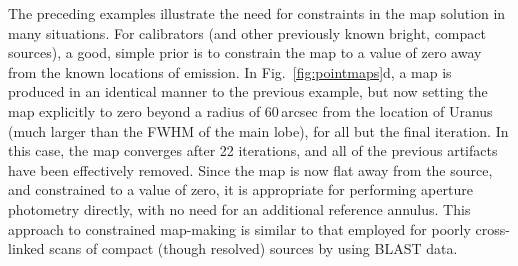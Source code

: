 \documentclass[useAMS,usenatbib,nofootinbib]{mn2e}
\begin{document}
The preceding examples illustrate the need for constraints in the map
solution in many situations. For calibrators (and other previously
known bright, compact sources), a good, simple prior is to constrain
the map to a value of zero away from the known locations of
emission. In Fig.~\ref{fig:pointmaps}d, a map is produced in an
identical manner to the previous example, but now setting the map
explicitly to zero beyond a radius of 60\,arcsec from the location of
Uranus (much larger than the FWHM of the main lobe), for all but the
final iteration. In this case, the map converges after 22 iterations,
and all of the previous artifacts have been effectively removed. Since
the map is now flat away from the source, and constrained to a value
of zero, it is appropriate for performing aperture photometry
directly, with no need for an additional reference annulus. This
approach to constrained map-making is similar to that employed for
poorly cross-linked scans of compact (though resolved) sources by
\citet{wiebe2009} using BLAST data.
\end{document}
